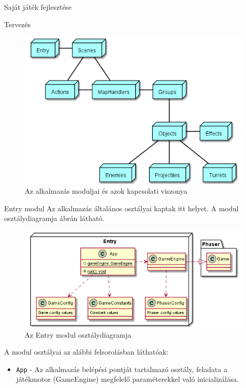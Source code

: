 \begin{MyChapter}{Saját játék fejlesztése}
\begin{MySection}{Tervezés}
		\begin{figure}[h!]
			\centering
			\includegraphics[width=1\textwidth]{kepek/uml/modules.png}
			\caption{Az alkalmazás moduljai és azok kapcsolati viszonya}
			\label{fig:uml:module}
		\end{figure}
		
		
		\begin{MySubSection}{Entry modul}
			Az alkalmazás általános osztályai kaptak itt helyet.
			A modul osztálydiagramja  ábrán látható.
			
			\begin{figure}[h!]
				\centering
				\includegraphics[scale=0.8]{kepek/uml/entry/entry.png}
				\caption{Az Entry modul osztálydiagramja}
				\label{fig:uml:entry}
			\end{figure}
		
			A modul osztályai az alábbi felsorolásban láthatóak:
			\begin{itemize}
				\item \texttt{App} - Az alkalmazás belépési pontját tartalmazó osztály, feladata a játékmotor (GameEngine) megfelelő paraméterekkel való inicializálása.
				

\end{itemize}
\end{MySubSection}
\end{MySection}
\end{MyChapter}
